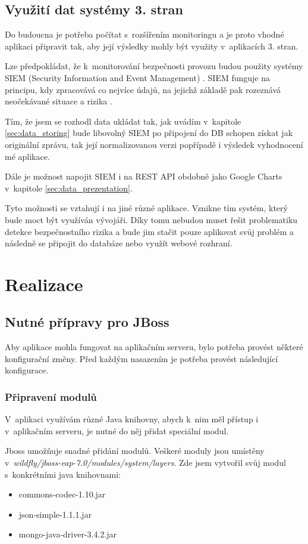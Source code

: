 \documentclass[thesis=M,czech]{FITthesis}[2012/10/20]
\begin{document}
	\section{Využití dat systémy 3. stran}
		Do budoucna je potřeba počítat s~rozšířením monitoringu a je proto vhodné aplikaci připravit tak, aby její výsledky mohly být využity v~aplikacích 3. stran.
		
		Lze předpokládat, že k~monitorování bezpečnosti provozu budou použity systémy SIEM (Security Information and Event Management) \cite{siem}.
		SIEM funguje na principu, kdy zpracovává co nejvíce údajů, na jejichž základě pak rozeznává neočekávané situace a rizika \cite{howDesSiemWork}.
		
		Tím, že jsem se rozhodl data ukládat tak, jak uvádím v~kapitole \ref{sec:data_storing} bude libovolný SIEM po připojení do DB schopen získat jak originální zprávu, tak její normalizovanou verzi popřípadě i výsledek vyhodnocení mé aplikace.
		
		Dále je možnost napojit SIEM i na REST API obdobně jako Google Charts v~kapitole \ref{sec:data_prezentation}.
		
		Tyto možnosti se vztahují i na jiné různé aplikace. Vznikne tím systém, který bude moct být využíván vývojáři. Díky tomu nebudou muset řešit problematiku detekce bezpečnostního rizika a bude jim stačit pouze aplikovat svůj problém a následně se připojit do databáze nebo využít webové rozhraní. 
		
\chapter{Realizace}
	
	\section{Nutné přípravy pro JBoss}
		Aby aplikace mohla fungovat na aplikačním serveru, bylo potřeba provést některé konfigurační změny. Před každým nasazením je potřeba provést následující konfigurace.
		
		\subsection{Připravení modulů}
		V~aplikaci využívám různé Java knihovny, abych k~nim měl přístup i v~aplikačním serveru, je nutné do něj přidat speciální modul.
		
		Jboss umožňuje snadné přidání modulů. Veškeré moduly jsou umístěny v~\textit{wildfly/jboss-eap-7.0/modules/system/layers}. Zde jsem vytvořil svůj modul s~konkrétními java knihovnami:
		\begin{itemize} 
			\item commons-codec-1.10.jar
			\item json-simple-1.1.1.jar
			\item mongo-java-driver-3.4.2.jar		
		\end{itemize}
	
\end{document}
